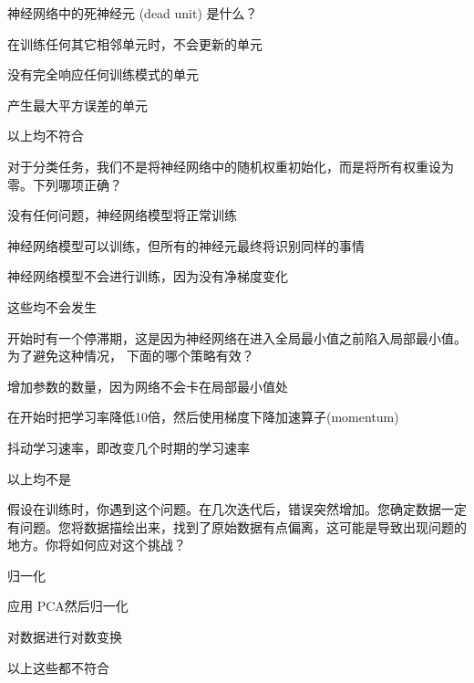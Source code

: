 \documentclass{exam-zh}
\begin{document}
\begin{question}
	神经网络中的死神经元 (dead unit) 是什么？\paren[A]
	\begin{choices}
		\item 在训练任何其它相邻单元时，不会更新的单元
		\item 没有完全响应任何训练模式的单元
		\item 产生最大平方误差的单元
		\item 以上均不符合
	\end{choices}
\end{question}

\begin{question}
	对于分类任务，我们不是将神经网络中的随机权重初始化，而是将所有权重设为零。下列哪项正确？\paren[B]
	\begin{choices}
		\item 没有任何问题，神经网络模型将正常训练
		\item 神经网络模型可以训练，但所有的神经元最终将识别同样的事情
		\item 神经网络模型不会进行训练，因为没有净梯度变化
		\item 这些均不会发生
	\end{choices}
\end{question}

\begin{question}
	开始时有一个停滞期，这是因为神经网络在进入全局最小值之前陷入局部最小值。为了避免这种情况， 下面的哪个策略有效？\paren[C]
	\begin{choices}
		\item 增加参数的数量，因为网络不会卡在局部最小值处
		\item 在开始时把学习率降低10倍，然后使用梯度下降加速算子(momentum)
		\item 抖动学习速率，即改变几个时期的学习速率
		\item 以上均不是
	\end{choices}
\end{question}

\begin{question}
	假设在训练时，你遇到这个问题。在几次迭代后，错误突然增加。您确定数据一定有问题。您将数据描绘出来，找到了原始数据有点偏离，这可能是导致出现问题的地方。你将如何应对这个挑战？\paren[B]
	\begin{choices}
		\item 归一化
		\item 应用 PCA然后归一化
		\item 对数据进行对数变换
		\item 以上这些都不符合
	\end{choices}
\end{question}
\end{document}
